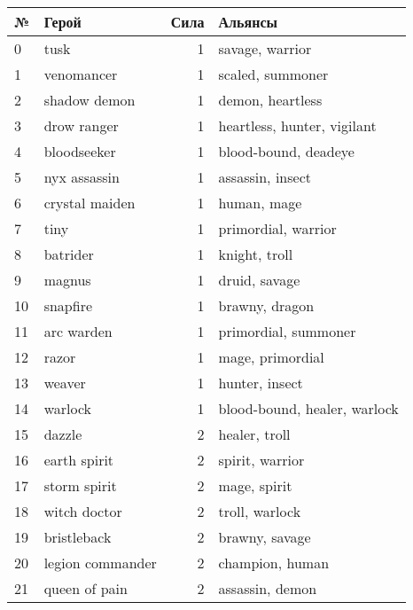 \documentclass{article}
\begin{document}
\begin{table}
\center
\resizebox{!}{9cm} {
\begin{tabular}{llrl}
{№} &                 Герой &  Сила &                       Альянсы \\
\midrule
0  &                 tusk &      1 &               savage, warrior  \\
1  &           venomancer &      1 &               scaled, summoner \\
2  &         shadow demon &      1 &               demon, heartless \\
3  &          drow ranger &      1 &    heartless, hunter, vigilant \\
4  &          bloodseeker &      1 &           blood-bound, deadeye \\
5  &         nyx assassin &      1 &               assassin, insect \\
6  &       crystal maiden &      1 &                    human, mage \\
7  &                 tiny &      1 &           primordial, warrior  \\
8  &             batrider &      1 &                  knight, troll \\
9  &               magnus &      1 &                  druid, savage \\
10 &             snapfire &      1 &                 brawny, dragon \\
11 &           arc warden &      1 &           primordial, summoner \\
12 &                razor &      1 &               mage, primordial \\
13 &               weaver &      1 &                 hunter, insect \\
14 &              warlock &      1 &  blood-bound, healer, warlock  \\
15 &               dazzle &      2 &                  healer, troll \\
16 &         earth spirit &      2 &               spirit, warrior  \\
17 &         storm spirit &      2 &                   mage, spirit \\
18 &         witch doctor &      2 &                troll, warlock  \\
19 &          bristleback &      2 &                 brawny, savage \\
20 &     legion commander &      2 &                champion, human \\
21 &        queen of pain &      2 &                assassin, demon \\

\end{tabular}}
\end{table}
\end{document}
